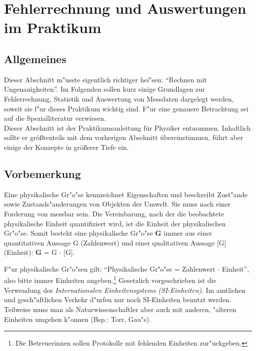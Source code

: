 \chapter{Fehlerrechnung und Auswertungen im Praktikum} \label{v:fehler}

\section{Allgemeines}

Dieser Abschnitt m"usste eigentlich richtiger hei"sen: "`Rechnen mit
Ungenauigkeiten"'. Im Folgenden sollen kurz
einige Grundlagen zur Fehlerrechnung,
Statistik und Auswertung von
Messdaten dargelegt werden, soweit sie f"ur
dieses Praktikum wichtig sind. F"ur eine genauere Betrachtung sei
auf die Spezialliteratur
verwiesen.\\

\noindent
Dieser Abschnitt ist der Praktikumsanleitung für Physiker entnommen. Inhaltlich sollte er größtenteils mit dem vorherigen Abschnitt übereinstimmen, führt aber einige der Konzepte in größerer Tiefe ein.

\section{Vorbemerkung}

Eine physikalische Gr"o"se kennzeichnet
Eigenschaften und beschreibt Zust"ande sowie Zustands"anderungen von
Objekten der Umwelt. Sie muss nach einer Forderung von
 messbar sein. Die Vereinbarung, nach der die
beobachtete physikalische Einheit quantifiziert wird, ist die
Einheit der physikalischen Gr"o"se. Somit besteht eine physikalische
Gr"o"se {\bf G} immer aus einer quantitativen Aussage G (Zahlenwert)
und einer qualitativen Aussage [G] (Einheit): {\bf G} = G $\cdot$
[G].

F"ur physikalische Gr"o"sen gilt: "`Physikalische Gr"o"se = Zahlenwert
$\cdot$ Einheit"', also bitte immer Einheiten angeben.\footnote{Die
Betreuerinnen sollen Protokolle mit fehlenden Einheiten
zur"uckgeben.} Gesetzlich vorgeschrieben ist die Verwendung des
\emph{Internationalen Einheitensystems
(SI-Einheiten)}. Im amtlichen und gesch"aftlichen
Verkehr d"urfen nur noch SI-Einheiten benutzt werden. Teilweise muss man als Naturwissenschaftler aber
auch mit anderen, "alteren Einheiten umgehen k"onnen (Bsp.: Torr,
Gau"s). %

